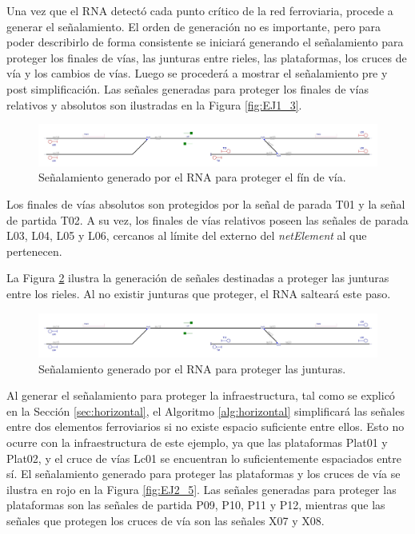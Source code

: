 	Una vez que el RNA detectó cada punto crítico de la red ferroviaria, procede a generar el señalamiento. El orden de generación no es importante, pero para poder describirlo de forma consistente se iniciará generando el señalamiento para proteger los finales de vías, las junturas entre rieles, las plataformas, los cruces de vía y los cambios de vías. Luego se procederá a mostrar el señalamiento pre y post simplificación. Las señales generadas para proteger los finales de vías relativos y absolutos son ilustradas en la Figura \ref{fig:EJ1_3}.

	\begin{figure}[H]
		\centering
		\includegraphics[width=1\textwidth]{resultados-obtenidos/ejemplo2/images/2_step1.png}
		\centering\caption{Señalamiento generado por el RNA para proteger el fín de vía.}
		\label{fig:EJ2_3}
	\end{figure}

	Los finales de vías absolutos son protegidos por la señal de parada T01 y la señal de partida T02. A su vez, los finales de vías relativos poseen las señales de parada L03, L04, L05 y L06, cercanos al límite del externo del \textit{netElement} al que pertenecen.

	La Figura \ref{fig:EJ2_4} ilustra la generación de señales destinadas a proteger las junturas entre los rieles. Al no existir junturas que proteger, el RNA salteará este paso.
	
	\begin{figure}[H]
		\centering
		\includegraphics[width=1\textwidth]{resultados-obtenidos/ejemplo2/images/2_step2.png}
		\centering\caption{Señalamiento generado por el RNA para proteger las junturas.}
		\label{fig:EJ2_4}
	\end{figure}
	
	Al generar el señalamiento para proteger la infraestructura, tal como se explicó en la Sección \ref{sec:horizontal}, el Algoritmo \ref{alg:horizontal} simplificará las señales entre dos elementos ferroviarios si no existe espacio suficiente entre ellos. Esto no ocurre con la infraestructura de este ejemplo, ya que las plataformas Plat01 y Plat02, y el cruce de vías Lc01 se encuentran lo suficientemente espaciados entre sí. El señalamiento generado para proteger las plataformas y los cruces de vía se ilustra en rojo en la Figura \ref{fig:EJ2_5}. Las señales generadas para proteger las plataformas son las señales de partida P09, P10, P11 y P12, mientras que las señales que protegen los cruces de vía son las señales X07 y X08.
	
